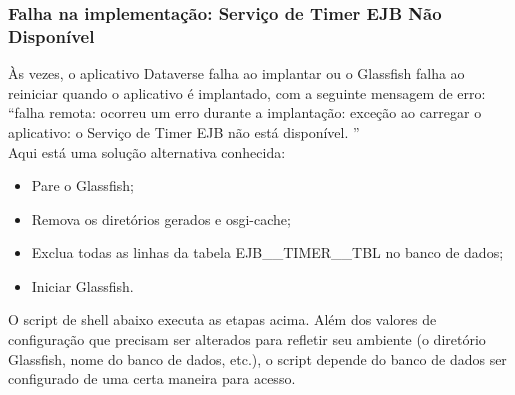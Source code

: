\documentclass[12pt,hidelinks]{article}
\begin{document}
\subsubsection{Falha na implementação: Serviço de Timer EJB Não Disponível}

\qquad Às vezes, o aplicativo Dataverse falha ao implantar ou o Glassfish falha ao reiniciar quando o aplicativo é implantado, com a seguinte mensagem de erro:\\

“falha remota: ocorreu um erro durante a implantação: exceção ao carregar o aplicativo: o Serviço de Timer EJB não está disponível. ”\\

Aqui está uma solução alternativa conhecida:

\begin{itemize}

    \item Pare o Glassfish;
    \item Remova os diretórios gerados e osgi-cache;
    \item Exclua todas as linhas da tabela EJB\_\_TIMER\_\_TBL no banco de dados;
    \item Iniciar Glassfish.

\end{itemize}

O script de shell abaixo executa as etapas acima. Além dos valores de configuração que precisam ser alterados para refletir seu ambiente (o diretório Glassfish, nome do banco de dados, etc.), o script depende do banco de dados ser configurado de uma certa maneira para acesso.
\end{document}
